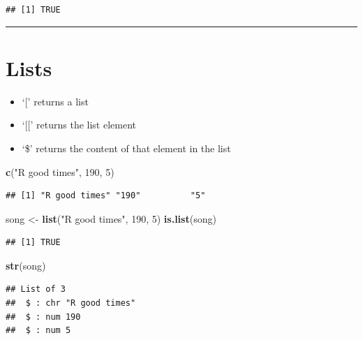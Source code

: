 \documentclass[]{book}
\newenvironment{Shaded}{\begin{snugshade}}{\end{snugshade}}
\newcommand{\KeywordTok}[1]{\textcolor[rgb]{0.13,0.29,0.53}{\textbf{{#1}}}}
\newcommand{\DecValTok}[1]{\textcolor[rgb]{0.00,0.00,0.81}{{#1}}}
\newcommand{\StringTok}[1]{\textcolor[rgb]{0.31,0.60,0.02}{{#1}}}
\newcommand{\NormalTok}[1]{{#1}}
\providecommand{\tightlist}{%
  \setlength{\itemsep}{0pt}\setlength{\parskip}{0pt}}
\begin{document}
\begin{verbatim}
## [1] TRUE
\end{verbatim}

\begin{center}\rule{0.5\linewidth}{\linethickness}\end{center}

\section{Lists}\label{lists}

\begin{itemize}
\tightlist
\item
  `{[}' returns a list
\item
  `{[}{[}' returns the list element
\item
  `\$' returns the content of that element in the list
\end{itemize}

\begin{Shaded}
\begin{Highlighting}[]
\KeywordTok{c}\NormalTok{(}\StringTok{"R good times"}\NormalTok{, }\DecValTok{190}\NormalTok{, }\DecValTok{5}\NormalTok{)}
\end{Highlighting}
\end{Shaded}

\begin{verbatim}
## [1] "R good times" "190"          "5"
\end{verbatim}

\begin{Shaded}
\begin{Highlighting}[]
\NormalTok{song <-}\StringTok{ }\KeywordTok{list}\NormalTok{(}\StringTok{"R good times"}\NormalTok{, }\DecValTok{190}\NormalTok{, }\DecValTok{5}\NormalTok{)}
\KeywordTok{is.list}\NormalTok{(song)}
\end{Highlighting}
\end{Shaded}

\begin{verbatim}
## [1] TRUE
\end{verbatim}

\begin{Shaded}
\begin{Highlighting}[]
\KeywordTok{str}\NormalTok{(song)}
\end{Highlighting}
\end{Shaded}

\begin{verbatim}
## List of 3
##  $ : chr "R good times"
##  $ : num 190
##  $ : num 5
\end{verbatim}
\end{document}
